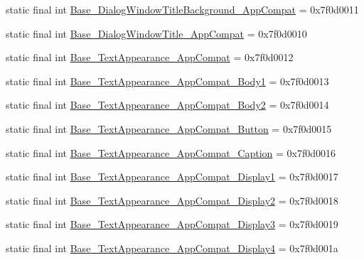 \begin{DoxyCompactItemize}
static final int \mbox{\hyperlink{classcom_1_1google_1_1android_1_1gms_1_1R_1_1style_a53761bc65daafe6707690f4c7b557545}{Base\+\_\+\+Dialog\+Window\+Title\+Background\+\_\+\+App\+Compat}} = 0x7f0d0011
\item 
static final int \mbox{\hyperlink{classcom_1_1google_1_1android_1_1gms_1_1R_1_1style_afaacabf93b328e45e162f68834b57759}{Base\+\_\+\+Dialog\+Window\+Title\+\_\+\+App\+Compat}} = 0x7f0d0010
\item 
static final int \mbox{\hyperlink{classcom_1_1google_1_1android_1_1gms_1_1R_1_1style_ac2a8379c2153c509be7e5ba04502b6ce}{Base\+\_\+\+Text\+Appearance\+\_\+\+App\+Compat}} = 0x7f0d0012
\item 
static final int \mbox{\hyperlink{classcom_1_1google_1_1android_1_1gms_1_1R_1_1style_a2581550b775d8ac6929811daa4b54cf0}{Base\+\_\+\+Text\+Appearance\+\_\+\+App\+Compat\+\_\+\+Body1}} = 0x7f0d0013
\item 
static final int \mbox{\hyperlink{classcom_1_1google_1_1android_1_1gms_1_1R_1_1style_afaef9b79ff96e580424d27c41520c5a4}{Base\+\_\+\+Text\+Appearance\+\_\+\+App\+Compat\+\_\+\+Body2}} = 0x7f0d0014
\item 
static final int \mbox{\hyperlink{classcom_1_1google_1_1android_1_1gms_1_1R_1_1style_a89e5b058f593e0811a83c652f41c0062}{Base\+\_\+\+Text\+Appearance\+\_\+\+App\+Compat\+\_\+\+Button}} = 0x7f0d0015
\item 
static final int \mbox{\hyperlink{classcom_1_1google_1_1android_1_1gms_1_1R_1_1style_a2dbf6d5af24176063fd380f0ea11eabc}{Base\+\_\+\+Text\+Appearance\+\_\+\+App\+Compat\+\_\+\+Caption}} = 0x7f0d0016
\item 
static final int \mbox{\hyperlink{classcom_1_1google_1_1android_1_1gms_1_1R_1_1style_ae3f91afc42c70e7d17512e450bb63e9d}{Base\+\_\+\+Text\+Appearance\+\_\+\+App\+Compat\+\_\+\+Display1}} = 0x7f0d0017
\item 
static final int \mbox{\hyperlink{classcom_1_1google_1_1android_1_1gms_1_1R_1_1style_a0e95793017089a753545f68326d18859}{Base\+\_\+\+Text\+Appearance\+\_\+\+App\+Compat\+\_\+\+Display2}} = 0x7f0d0018
\item 
static final int \mbox{\hyperlink{classcom_1_1google_1_1android_1_1gms_1_1R_1_1style_a40c5486ffa4b08543f8bb63ebc6b1d68}{Base\+\_\+\+Text\+Appearance\+\_\+\+App\+Compat\+\_\+\+Display3}} = 0x7f0d0019
\item 
static final int \mbox{\hyperlink{classcom_1_1google_1_1android_1_1gms_1_1R_1_1style_ad56cf11cfe0106bc19bc98932ef5025d}{Base\+\_\+\+Text\+Appearance\+\_\+\+App\+Compat\+\_\+\+Display4}} = 0x7f0d001a

\end{DoxyCompactItemize}

